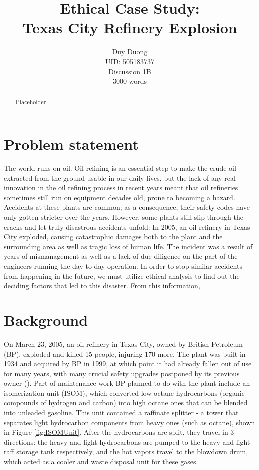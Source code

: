 \documentclass[12pt]{article}
\begin{document}
		\title{Ethical Case Study: \\Texas City Refinery Explosion}

	\author{Duy Duong\\UID: 505183737\\Discussion 1B\\3000 words}
	\maketitle
	
	\begin{abstract}
Placeholder
	\end{abstract}
	\setlength{\parskip}{1em}
	\section*{Problem statement}
	The world runs on oil. Oil refining is an essential step to make the crude oil extracted from the ground usable in our daily lives, but the lack of any real innovation in the oil refining process in recent years meant that oil refineries sometimes still run on equipment decades old, prone to becoming a hazard. Accidents at these plants are common; as a consequence, their safety codes have only gotten stricter over the years. However, some plants still slip through the cracks and let truly disastrous accidents unfold: In 2005, an oil refinery in Texas City exploded, causing catastrophic damages both to the plant and the surrounding area as well as tragic loss of human life. The incident was a result of years of mismanagement as well as a lack of due diligence on the part of the engineers running the day to day operation. In order to stop similar accidents from happening in the future, we must utilize ethical analysis to find out the deciding factors that led to this disaster. From this information, 
	\section*{Background}
	
	On March 23, 2005, an oil refinery in Texas City, owned by British Petroleum (BP), exploded and killed 15 people, injuring 170 more. The plant was built in 1934 and acquired by BP in 1999, at which point it had already fallen out of use for many years, with many crucial safety upgrades postponed by its previous owner (\cite{frontline_2010}). Part of maintenance work BP planned to do with the plant include an isomerization unit (ISOM), which converted low octane hydrocarbons (organic compounds of hydrogen and carbon) into high octane ones that can be blended into unleaded gasoline. This unit contained a raffinate splitter - a tower that separates light hydrocarbon components from heavy ones (such as octane), shown in Figure \ref{fig:ISOMUnit}. After the hydrocarbons are split, they travel in 3 directions: the heavy and light hydrocarbons are pumped to the heavy and light raff storage tank respectively, and the hot vapors travel to the blowdown drum, which acted as a cooler and waste disposal unit for these gases.
		
\end{document}
